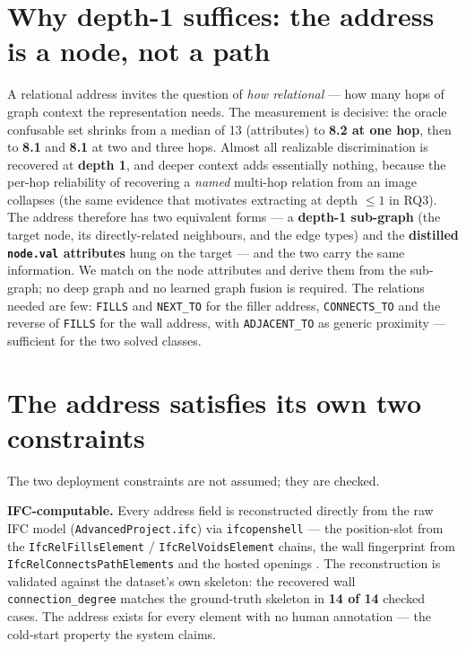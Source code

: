 \section{Why depth-1 suffices: the address is a node, not a path}

A relational address invites the question of \emph{how relational} --- how many hops of graph context
the representation needs. The measurement is decisive: the oracle confusable set shrinks from a median
of 13 (attributes) to \textbf{8.2 at one hop}, then to \textbf{8.1} and \textbf{8.1} at two and three
hops. Almost all realizable discrimination is recovered at \textbf{depth 1}, and deeper context adds
essentially nothing, because the per-hop reliability of recovering a \emph{named} multi-hop relation
from an image collapses (the same evidence that motivates extracting at depth $\le 1$ in RQ3). The
address therefore has two equivalent forms --- a \textbf{depth-1 sub-graph} (the target node, its
directly-related neighbours, and the edge types) and the \textbf{distilled \texttt{node.val}
attributes} hung on the target --- and the two carry the same information. We match on the node
attributes and derive them from the sub-graph; no deep graph and no learned graph fusion is required.
The relations needed are few: \texttt{FILLS} and \texttt{NEXT\_TO} for the filler address,
\texttt{CONNECTS\_TO} and the reverse of \texttt{FILLS} for the wall address, with \texttt{ADJACENT\_TO}
as generic proximity --- sufficient for the two solved classes.

\section{The address satisfies its own two constraints}

The two deployment constraints are not assumed; they are checked.

\noindent\textbf{IFC-computable.} Every address field is reconstructed directly from the raw IFC
model (\texttt{AdvancedProject.ifc}) via \texttt{ifcopenshell} --- the position-slot from the
\texttt{IfcRelFillsElement} / \texttt{IfcRelVoidsElement} chains, the wall fingerprint from
\texttt{IfcRelConnectsPathElements} and the hosted openings \citep{buildingsmart2024ifc4x3}. The
reconstruction is validated against the dataset's own skeleton: the recovered wall
\texttt{connection\_degree} matches the ground-truth skeleton in \textbf{14 of 14} checked cases. The
address exists for every element with no human annotation --- the cold-start property the system
claims.

